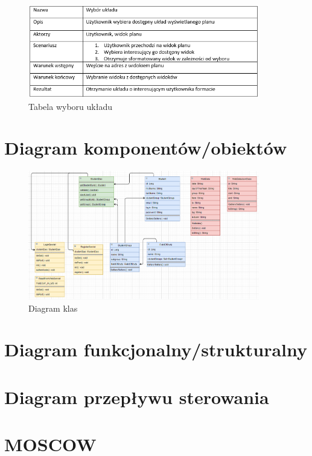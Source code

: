 \documentclass[a4paper,11pt]{uzreport}
\begin{document}
     \begin{figure}[ht!]
        \centering
        \includegraphics[width=0.9\textwidth]{pictures/wybor ukladu.PNG}
        \caption{Tabela wyboru układu}
        \label{fig9}
     \end{figure}

\clearpage
\section{Diagram komponentów/obiektów}

	\begin{figure}[ht!]
        	\centering
        	\includegraphics[width=0.9\textwidth]{pictures/Diagram_klas.png}
        	\caption{Diagram klas}
       		\label{diagram_klas}
     	\end{figure}

\section{Diagram funkcjonalny/strukturalny}

\section{Diagram przepływu sterowania}

\clearpage
\section{MOSCOW}
\end{document}
